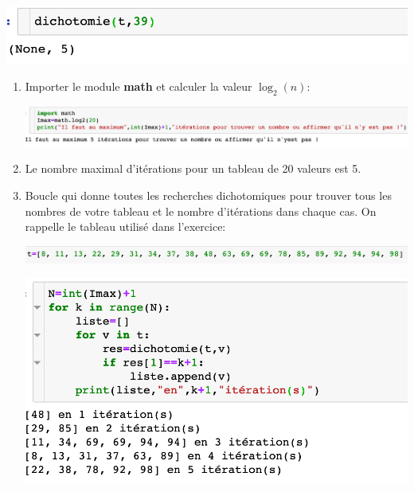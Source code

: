 \documentclass[11pt,a4paper]{article}
\newcounter{num}
\begin{document}
\begin{enumerate}
\begin{enumerate}
\begin{center}
\includegraphics[scale=0.57]{../img/Ex-dicho-3-4.png}
\end{center}
\end{enumerate}
\begin{enumerate}
\item Importer le module \textbf{math} et calculer la valeur $\log_{2}(n)$:
\begin{flushleft}
\includegraphics[scale=0.52]{../img/Ex-dicho-3-6.png}
\end{flushleft}
\item Le nombre maximal d'itérations pour un tableau de 20 valeurs est 5.
\item Boucle qui donne toutes les recherches dichotomiques pour trouver tous les nombres de votre tableau et le nombre d'itérations dans chaque cas.
On rappelle le tableau utilisé dans l'exercice:
\begin{flushleft}
\includegraphics[scale=0.6]{../img/Ex-dicho-3-8.png}
\end{flushleft}
\begin{center}
\includegraphics[scale=0.6]{../img/Ex-dicho-3-7.png}
\end{center}
\end{enumerate}
\end{enumerate}
\end{document}
